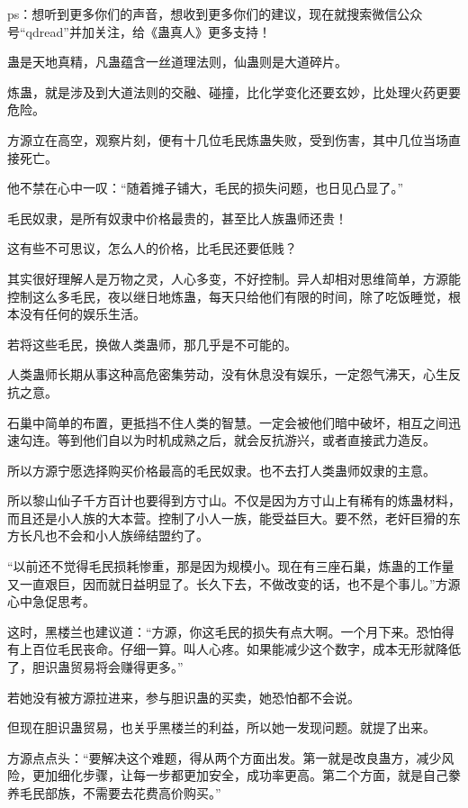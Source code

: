 
\begin{this_body}

ps：想听到更多你们的声音，想收到更多你们的建议，现在就搜索微信公众号“qdread”并加关注，给《蛊真人》更多支持！

蛊是天地真精，凡蛊蕴含一丝道理法则，仙蛊则是大道碎片。

炼蛊，就是涉及到大道法则的交融、碰撞，比化学变化还要玄妙，比处理火药更要危险。

方源立在高空，观察片刻，便有十几位毛民炼蛊失败，受到伤害，其中几位当场直接死亡。

他不禁在心中一叹：“随着摊子铺大，毛民的损失问题，也日见凸显了。”

毛民奴隶，是所有奴隶中价格最贵的，甚至比人族蛊师还贵！

这有些不可思议，怎么人的价格，比毛民还要低贱？

其实很好理解人是万物之灵，人心多变，不好控制。异人却相对思维简单，方源能控制这么多毛民，夜以继日地炼蛊，每天只给他们有限的时间，除了吃饭睡觉，根本没有任何的娱乐生活。

若将这些毛民，换做人类蛊师，那几乎是不可能的。

人类蛊师长期从事这种高危密集劳动，没有休息没有娱乐，一定怨气沸天，心生反抗之意。

石巢中简单的布置，更抵挡不住人类的智慧。一定会被他们暗中破坏，相互之间迅速勾连。等到他们自以为时机成熟之后，就会反抗游兴，或者直接武力造反。

所以方源宁愿选择购买价格最高的毛民奴隶。也不去打人类蛊师奴隶的主意。

所以黎山仙子千方百计也要得到方寸山。不仅是因为方寸山上有稀有的炼蛊材料，而且还是小人族的大本营。控制了小人一族，能受益巨大。要不然，老奸巨猾的东方长凡也不会和小人族缔结盟约了。

“以前还不觉得毛民损耗惨重，那是因为规模小。现在有三座石巢，炼蛊的工作量又一直艰巨，因而就日益明显了。长久下去，不做改变的话，也不是个事儿。”方源心中急促思考。

这时，黑楼兰也建议道：“方源，你这毛民的损失有点大啊。一个月下来。恐怕得有上百位毛民丧命。仔细一算。叫人心疼。如果能减少这个数字，成本无形就降低了，胆识蛊贸易将会赚得更多。”

若她没有被方源拉进来，参与胆识蛊的买卖，她恐怕都不会说。

但现在胆识蛊贸易，也关乎黑楼兰的利益，所以她一发现问题。就提了出来。

方源点点头：“要解决这个难题，得从两个方面出发。第一就是改良蛊方，减少风险，更加细化步骤，让每一步都更加安全，成功率更高。第二个方面，就是自己豢养毛民部族，不需要去花费高价购买。”


\end{this_body}
